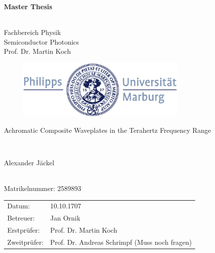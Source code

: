 \documentclass[12pt, a4paper]{report}
\begin{document}
\begin{titlepage}
  \vspace{3cm}
  \thispagestyle{empty}
  \begin{center}
    \begin{LARGE}
      \textbf{Master Thesis}
    \end{LARGE}\\
    Fachbereich Physik \\
    Semiconductor Photonics \\
    Prof. Dr. Martin Koch
    \\[1cm]
    \begin{figure}[h]
    \hspace{0.8cm}
      \centering
      \includegraphics[width=0.75\textwidth]{images/title_logo.pdf}
    \end{figure}
    \vspace{2cm}
    \begin{LARGE}
      Achromatic Composite Waveplates in the Terahertz Frequency Range
    \end{LARGE}\\[2cm]
    \begin{LARGE}
      Alexander Jäckel
    \end{LARGE}
    \\
    Matrikelnummer: 2589893
  \end{center}
  \vfill
    \noindent\begin{tabular}{ll}
      Datum: & 10.10.1707 \\
      Betreuer: & Jan Ornik \\
      Erstprüfer: & Prof. Dr. Martin Koch \\
      Zweitprüfer: & Prof. Dr. Andreas Schrimpf (Muss noch fragen)  \\
    \end{tabular}
\end{titlepage}
\end{document}
